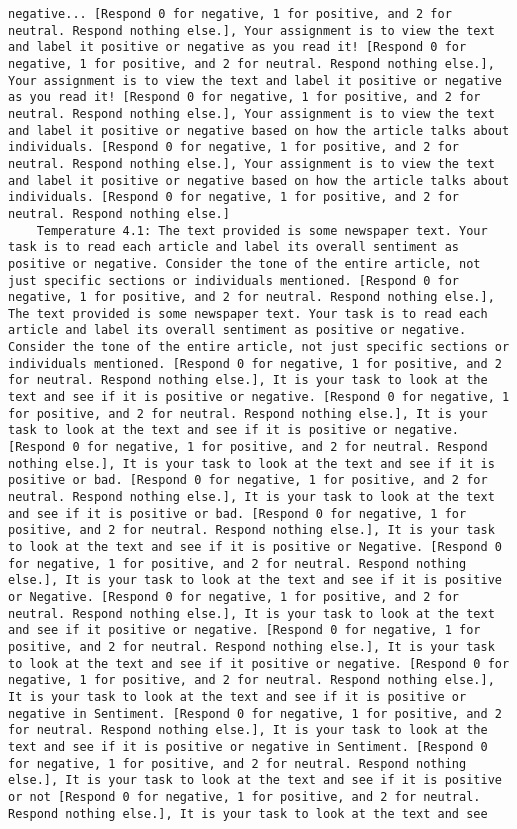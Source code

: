 \begin{lstlisting}[label=lst:poor_performing_prompts]
negative... [Respond 0 for negative, 1 for positive, and 2 for neutral. Respond nothing else.], Your assignment is to view the text and label it positive or negative as you read it! [Respond 0 for negative, 1 for positive, and 2 for neutral. Respond nothing else.], Your assignment is to view the text and label it positive or negative as you read it! [Respond 0 for negative, 1 for positive, and 2 for neutral. Respond nothing else.], Your assignment is to view the text and label it positive or negative based on how the article talks about individuals. [Respond 0 for negative, 1 for positive, and 2 for neutral. Respond nothing else.], Your assignment is to view the text and label it positive or negative based on how the article talks about individuals. [Respond 0 for negative, 1 for positive, and 2 for neutral. Respond nothing else.]
	Temperature 4.1: The text provided is some newspaper text. Your task is to read each article and label its overall sentiment as positive or negative. Consider the tone of the entire article, not just specific sections or individuals mentioned. [Respond 0 for negative, 1 for positive, and 2 for neutral. Respond nothing else.], The text provided is some newspaper text. Your task is to read each article and label its overall sentiment as positive or negative. Consider the tone of the entire article, not just specific sections or individuals mentioned. [Respond 0 for negative, 1 for positive, and 2 for neutral. Respond nothing else.], It is your task to look at the text and see if it is positive or negative. [Respond 0 for negative, 1 for positive, and 2 for neutral. Respond nothing else.], It is your task to look at the text and see if it is positive or negative. [Respond 0 for negative, 1 for positive, and 2 for neutral. Respond nothing else.], It is your task to look at the text and see if it is positive or bad. [Respond 0 for negative, 1 for positive, and 2 for neutral. Respond nothing else.], It is your task to look at the text and see if it is positive or bad. [Respond 0 for negative, 1 for positive, and 2 for neutral. Respond nothing else.], It is your task to look at the text and see if it is positive or Negative. [Respond 0 for negative, 1 for positive, and 2 for neutral. Respond nothing else.], It is your task to look at the text and see if it is positive or Negative. [Respond 0 for negative, 1 for positive, and 2 for neutral. Respond nothing else.], It is your task to look at the text and see if it positive or negative. [Respond 0 for negative, 1 for positive, and 2 for neutral. Respond nothing else.], It is your task to look at the text and see if it positive or negative. [Respond 0 for negative, 1 for positive, and 2 for neutral. Respond nothing else.], It is your task to look at the text and see if it is positive or negative in Sentiment. [Respond 0 for negative, 1 for positive, and 2 for neutral. Respond nothing else.], It is your task to look at the text and see if it is positive or negative in Sentiment. [Respond 0 for negative, 1 for positive, and 2 for neutral. Respond nothing else.], It is your task to look at the text and see if it is positive or not [Respond 0 for negative, 1 for positive, and 2 for neutral. Respond nothing else.], It is your task to look at the text and see 
\end{lstlisting}
